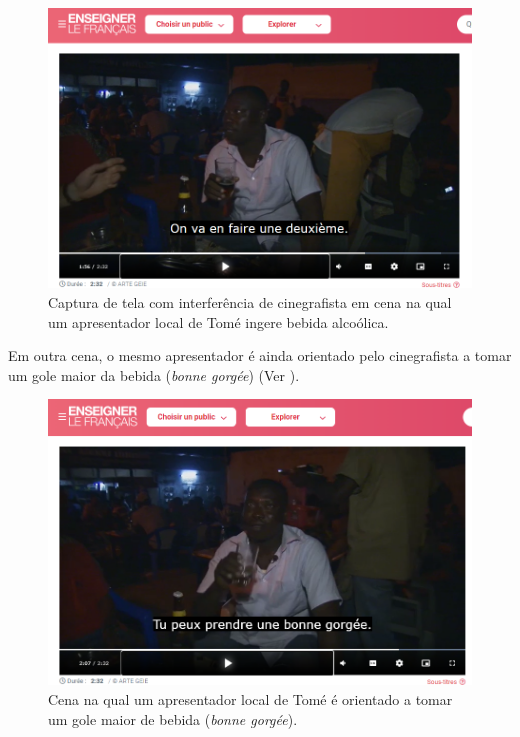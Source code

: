 \documentclass[portuguese]{textolivre}
\begin{document}
\begin{figure}[h!]
    \centering
    \begin{minipage}{.55\textwidth}
    \includegraphics[width=\linewidth]{Fig9.png}
    \caption{Captura de tela com interferência de cinegrafista em cena na qual um apresentador local de Tomé ingere bebida alcoólica.}
    \label{fig9}
    \end{minipage}
\end{figure}

Em outra cena, o mesmo apresentador é ainda orientado pelo cinegrafista a tomar um gole maior da bebida (\textit{bonne gorgée}) (Ver ).

\begin{figure}[h!]
    \centering
    \begin{minipage}{.55\textwidth}
    \includegraphics[width=\linewidth]{Fig10.png}
    \caption{Cena na qual um apresentador local de Tomé é orientado a tomar um gole maior de bebida (\textit{bonne gorgée}).}
    \label{fig10}
    \end{minipage}
\end{figure}
\end{document}
